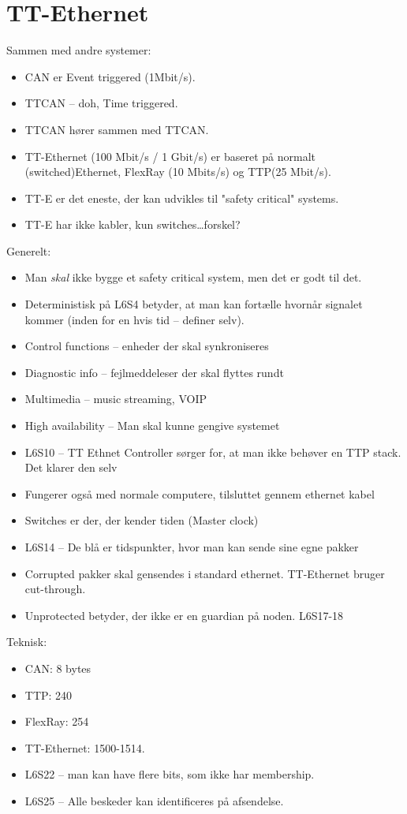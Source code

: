 \documentclass[oneside, 10pt]{article}
\begin{document}
\newpage
\section{TT-Ethernet}

Sammen med andre systemer:
\begin{itemize}
	\item CAN er Event triggered (1Mbit/s).
	\item TTCAN -- doh, Time triggered. 
	\item TTCAN hører sammen med TTCAN.
	\item TT-Ethernet (100 Mbit/s / 1 Gbit/s) er baseret på normalt (switched)Ethernet, FlexRay (10 Mbits/s) og TTP(25 Mbit/s).
	\item TT-E er det eneste, der kan udvikles til "safety critical" systems.
	\item TT-E har ikke kabler, kun switches\dots forskel?
\end{itemize}

Generelt:
\begin{itemize}
	\item Man \emph{skal} ikke bygge et safety critical system, men det er godt til det.
	\item Deterministisk på L6S4 betyder, at man kan fortælle hvornår signalet kommer (inden for en hvis tid -- definer selv).
	\item Control functions -- enheder der skal synkroniseres
	\item Diagnostic info -- fejlmeddeleser der skal flyttes rundt
	\item Multimedia -- music streaming, VOIP
	\item High availability -- Man skal kunne gengive systemet
	\item L6S10 -- TT Ethnet Controller sørger for, at man ikke behøver en TTP stack. Det klarer den selv
	\item Fungerer også med normale computere, tilsluttet gennem ethernet kabel
	\item Switches er der, der kender tiden (Master clock)
	\item L6S14 -- De blå er tidspunkter, hvor man kan sende sine egne pakker
	\item Corrupted pakker skal gensendes i standard ethernet. TT-Ethernet bruger cut-through.
	\item Unprotected betyder, der ikke er en guardian på noden. L6S17-18
\end{itemize}

Teknisk:
\begin{itemize}
	\item CAN: 8 bytes
	\item[] TTP: 240
	\item[] FlexRay: 254
	\item[] TT-Ethernet: 1500-1514.
	\item L6S22 -- man kan have flere bits, som ikke har membership.
	\item L6S25 -- Alle beskeder kan identificeres på afsendelse.
\end{itemize}
\end{document}
